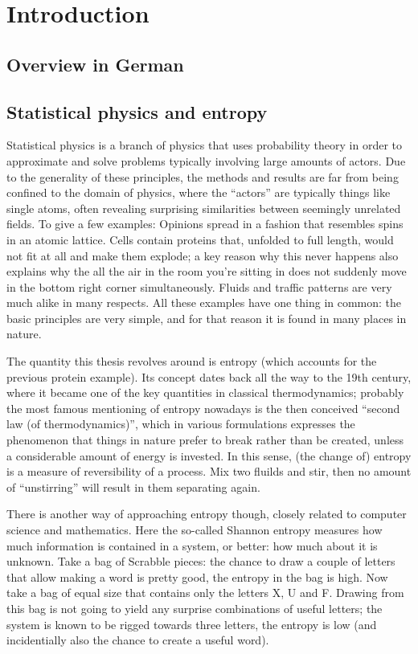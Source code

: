 \chapter{Introduction}


\section{Overview in German}



\section{Statistical physics and entropy}

Statistical physics is a branch of physics that uses probability theory in order to approximate and solve problems typically involving large amounts of actors. Due to the generality of these principles, the methods and results are far from being confined to the domain of physics, where the ``actors'' are typically things like single atoms, often revealing surprising similarities between seemingly unrelated fields. To give a few examples: Opinions spread in a fashion that resembles spins in an atomic lattice. Cells contain proteins that, unfolded to full length, would not fit at all and make them explode; a key reason why this never happens also explains why the all the air in the room you're sitting in does not suddenly move in the bottom right corner simultaneously. Fluids and traffic patterns are very much alike in many respects. All these examples have one thing in common: the basic principles are very simple, and for that reason it is found in many places in nature.

The quantity this thesis revolves around is entropy (which accounts for the previous protein example). Its concept dates back all the way to the 19th century, where it became one of the key quantities in classical thermodynamics; probably the most famous mentioning of entropy nowadays is the then conceived ``second law (of thermodynamics)'', which in various formulations expresses the phenomenon that things in nature prefer to break rather than be created, unless a considerable amount of energy is invested. In this sense, (the change of) entropy is a measure of reversibility of a process. Mix two fluilds and stir, then no amount of ``unstirring'' will result in them separating again.

There is another way of approaching entropy though, closely related to computer science and mathematics. Here the so-called Shannon entropy measures how much information is contained in a system, or better: how much about it is unknown. Take a bag of Scrabble pieces: the chance to draw a couple of letters that allow making a word is pretty good, the entropy in the bag is high. Now take a bag of equal size that contains only the letters X, U and F. Drawing from this bag is not going to yield any surprise combinations of useful letters; the system is known to be rigged towards three letters, the entropy is low (and incidentially also the chance to create a useful word).

